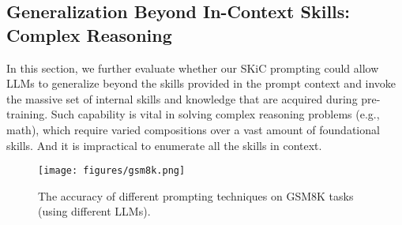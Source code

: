 \documentclass{article} \usepackage{arxiv}
\begin{document}
\subsection{Generalization Beyond In-Context Skills: Complex Reasoning}
In this section, we further evaluate whether our SKiC prompting could allow LLMs to generalize beyond the skills provided in the prompt context and invoke the massive set of internal skills and knowledge that are acquired during pre-training. 
Such capability is vital in solving complex reasoning problems (e.g., math), which require varied compositions over a vast amount of foundational skills. And it is impractical to enumerate all the skills in context.

\begin{figure*}[t]
\vskip 0.2in
\begin{center}
\centerline{\texttt{[image: figures/gsm8k.png]}}
\caption{The accuracy of different prompting techniques on GSM8K tasks (using different LLMs).} 
\label{fig:gsm8k_results}
\end{center}
\vskip -0.2in
\end{figure*}
\end{document}
